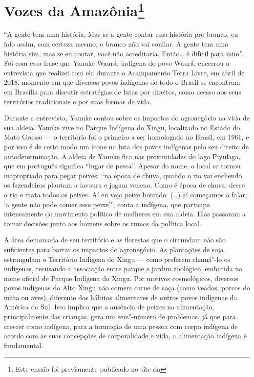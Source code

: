 \chapter*{Vozes da Amazônia\protect\footnote{Este ensaio foi %
  previamente publicado no site da {}}}

``A gente tem uma história. Mas se a gente contar essa história pro
branco, eu falo assim, com certeza mesmo, o branco não vai confiar. A
gente tem uma história sim, mas se eu contar, você não acreditaria.
Então\ldots{} é difícil para mim''. Foi com essa frase que Yanuke Waurá,
indígena do povo Waurá, encerrou a entrevista que realizei com ela
durante o Acampamento Terra Livre, em abril de 2018, momento em que
diversos povos indígenas de todo o Brasil se encontram em Brasília para
discutir estratégias de lutas por direitos, como acesso aos seus
territórios tradicionais e por suas formas de vida.

Durante a entrevista, Yanuke contou sobre os impactos do agronegócio na
vida de sua aldeia. Yanuke vive no Parque Indígena do Xingu, localizado
no Estado do Mato Grosso --- o território foi o primeiro a ser homologado
no Brasil, em 1961, e por isso é de certo modo um ícone na luta dos
povos indígenas pelo seu direito de autodeterminação. A aldeia de Yanuke
fica nas proximidades do lago Piyulaga, que em português significa
``lugar de pesca''. Apesar do nome, o local se tornou inapropriado para
pegar peixes: ``na época de chuva, quando o rio vai enchendo, os
fazendeiros plantam a lavoura e jogam veneno. Como é época de chuva,
desce o rio e mata todos os peixes. Aí eu vejo peixe boiando. (\ldots{}) aí
começamos a falar: `a gente não pode comer esse peixe'", conta a
indígena, que participa intensamente do movimento político de mulheres
em sua aldeia. Elas passaram a tomar decisões junto aos homens sobre os
rumos da política local.

A área demarcada de seu território e as florestas que o circundam não
são suficientes para barrar os impactos do agronegócio.
As plantações de soja estrangulam o Território Indígena do
Xingu --- como preferem chamá"-lo os indígenas, recusando a associação
entre parque e jardim zoológico, embutida no nome oficial de Parque
Indígena do Xingu. Por motivos cosmológicos, diversos povos indígenas do Alto Xingu
não comem carne de caça (como veados, porcos do mato ou aves), diferente
dos hábitos alimentares de outros povos indígenas da América do
Sul. Isso implica que a ausência de peixes na alimentação,
principalmente das crianças, gera um sem"-número de problemas, já que
para crescer como indígena, para a formação de uma pessoa com corpo
indígena de acordo com as suas concepções de corporalidade e vida, a
alimentação indígena é fundamental.


